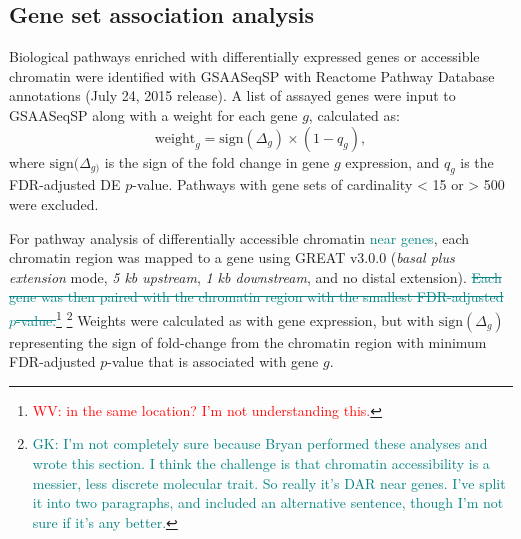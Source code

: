 \documentclass[9pt,twocolumn,twoside]{gsajnl}
\newcommand{\WV}[2]{\textcolor{red}{#1\footnote{\textcolor{red}{WV: #2}}}}
\newcommand{\WVinline}[1]{\textcolor{red}{#1}}
\newcommand{\GK}[2]{\textcolor{teal}{#1\footnote{\textcolor{teal}{GK: #2}}}}
\newcommand{\GKinline}[1]{\textcolor{teal}{#1}}
\newcommand{\GKst}[1]{\textcolor{teal}{\st{#1}}}
\begin{document}
\subsection{Gene set association analysis}

Biological pathways enriched with differentially expressed genes or accessible chromatin were identified with GSAASeqSP \citep{Xiong2014} with Reactome Pathway Database annotations (July 24, 2015 release). A list of assayed genes were input to GSAASeqSP along with a weight for each gene $g$, calculated as:
\begin{equation}
\text{weight}_{g} = \text{sign}(\Delta_{g}) \times (1-q_{g}),
\label{eq:gene_weighting}
\end{equation}
where $\text{sign}(\Delta_{g)}$ is the sign of the fold change in gene $g$ expression, and $q_{g}$ is the FDR-adjusted DE $p$-value. Pathways with gene sets of cardinality < 15 or > 500 were excluded. 

For pathway analysis of differentially accessible chromatin \GKinline{near genes}, each chromatin region was mapped to a gene using GREAT v3.0.0 (\textit{basal plus extension} mode, \textit{5 kb upstream}, \textit{1 kb downstream}, and no distal extension). 
\GKst{Each gene was then paired with the chromatin region with the smallest FDR-adjusted $p$-value.}\WV{}{in the same location? I'm not understanding this.}  
\GK{}{I'm not completely sure because Bryan performed these analyses and wrote this section. I think the challenge is that chromatin accessibility is a messier, less discrete molecular trait. So really it's DAR near genes. I've split it into two paragraphs, and included an alternative sentence, though I'm not sure if it's any better.} 
Weights were calculated as with gene expression, but with $\text{sign}(\Delta_{g})$ representing the sign of fold-change from the chromatin region with minimum FDR-adjusted $p$-value that is associated with gene $g$.

\end{document}
